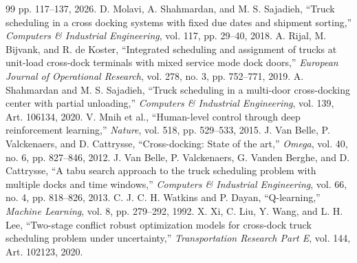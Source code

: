 \documentclass[11pt,a4paper]{article}
\begin{document}
\begin{thebibliography}{99}
pp. 117--137, 2026.
 D. Molavi, A. Shahmardan, and M. S. Sajadieh, ``Truck
scheduling in a cross docking systems with fixed due dates and shipment
sorting,'' \emph{Computers \& Industrial Engineering}, vol. 117, pp. 29--40,
2018.
 A. Rijal, M. Bijvank, and R. de Koster, ``Integrated
scheduling and assignment of trucks at unit-load cross-dock terminals with mixed service mode dock doors,''
\emph{European Journal of Operational Research}, vol. 278, no. 3,
pp. 752--771, 2019.
 A. Shahmardan and M. S. Sajadieh, ``Truck scheduling
in a multi-door cross-docking center with partial unloading,'' \emph{Computers
\& Industrial Engineering}, vol. 139, Art. 106134, 2020.
 V. Mnih et al., ``Human-level control through deep
reinforcement learning,'' \emph{Nature}, vol. 518, pp. 529--533, 2015.
 J. Van Belle, P. Valckenaers, and D. Cattrysse,
``Cross-docking: State of the art,'' \emph{Omega}, vol. 40, no. 6,
pp. 827--846, 2012.
 J. Van Belle, P. Valckenaers, G. Vanden Berghe, and
D. Cattrysse, ``A tabu search approach to the truck scheduling problem with
multiple docks and time windows,'' \emph{Computers \& Industrial Engineering},
vol. 66, no. 4, pp. 818--826, 2013.
 C. J. C. H. Watkins and P. Dayan, ``Q-learning,''
\emph{Machine Learning}, vol. 8, pp. 279--292, 1992.
 X. Xi, C. Liu, Y. Wang, and L. H. Lee, ``Two-stage conflict
robust optimization models for cross-dock truck scheduling problem under uncertainty,''
\emph{Transportation Research Part E}, vol. 144, Art. 102123, 2020.
\end{thebibliography}
\end{document}
